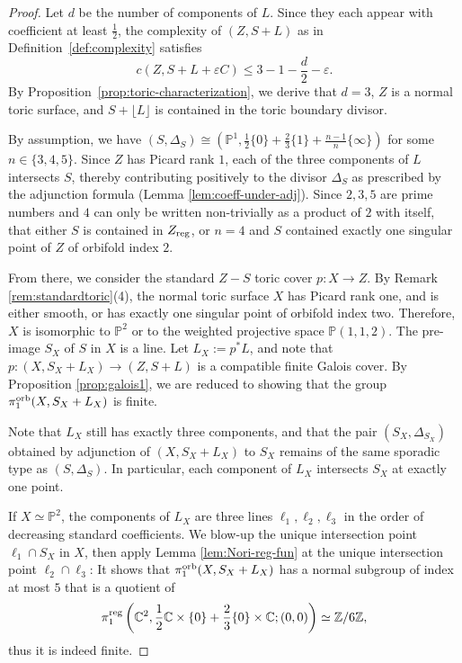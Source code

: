 \documentclass{amsart}
\newcommand{\pp}{\mathbb{P}}
\newcommand{\zz}{\mathbb{Z}}
\newcommand{\cc}{\mathbb{C}}
\theoremstyle{definition}
\theoremstyle{remark}
\numberwithin{equation}{section}
\begin{document}
\begin{proof}
Let $d$ be the number of components of $L$. Since they each appear with coefficient at least $\frac{1}{2}$, the complexity of $(Z,S+L)$ as in Definition~\ref{def:complexity} satisfies 
$$c(Z,S+L+\varepsilon C)\le 3-1-\frac{d}{2}-\varepsilon.$$ 
By Proposition~\ref{prop:toric-characterization}, we derive that $d=3$, $Z$ is a normal toric surface, and $S+\lfloor L\rfloor$ is contained in the toric boundary divisor.


By assumption, we have $(S,\Delta_S)\cong (\pp^1,\frac{1}{2}\{0\}+\frac{2}{3}\{1\}+\frac{n-1}{n}\{\infty\})$ for some $n\in\{3,4,5\}$.
Since $Z$ has Picard rank $1$, each of the three components of $L$ intersects $S$, thereby contributing positively to the divisor $\Delta_S$ as prescribed by the adjunction formula (Lemma \ref{lem:coeff-under-adj}). Since $2,3,5$ are prime numbers and $4$ can only be written non-trivially as a product of $2$ with itself, that either $S$ is contained in $Z_{\rm reg}$, or $n=4$ and $S$ contained exactly one singular point of $Z$ of orbifold index $2$.

From there, we consider the standard $Z - S$ toric cover $p:X\to Z$. By Remark \ref{rem:standardtoric}(4), the normal toric surface $X$ has Picard rank one, and is either smooth, or has exactly one singular point of orbifold index two. Therefore, $X$ is isomorphic to $\pp^2$ or to the weighted projective space $\pp(1,1,2)$. The pre-image $S_X$ of $S$ in $X$ is a line.
Let $L_X:=p^*L$, and note that $p:(X,S_X+L_X)\to (Z,S+L)$ is a compatible finite Galois cover. By Proposition \ref{prop:galois1}, we are reduced to showing that the group $\pi_1^{\rm orb}(X,S_X+L_X)$ is finite.

Note that $L_X$ still has exactly three components, and that the pair $(S_X,\Delta_{S_X})$ obtained by adjunction of $(X,S_X+L_X)$ to $S_X$ remains of the same sporadic type as $(S,\Delta_S)$. In particular, each component of $L_X$ intersects $S_X$ at exactly one point. 

If $X\simeq \pp^2$, the components of $L_X$ are three lines $\ell_1,\ell_2,\ell_3$ in the order of decreasing standard coefficients. We blow-up the unique intersection point $\ell_1\cap S_X$ in $X$, then apply Lemma \ref{lem:Nori-reg-fun} at the unique intersection point $\ell_2\cap \ell_3$: It shows that $\pi_1^{\rm orb}(X,S_X+L_X)$ has a normal subgroup of index at most $5$ that is a quotient of 
$$\pi_1^{\rm reg}\left(\cc^2,\frac{1}{2}\cc\times \{0\} + \frac{2}{3}\{0\}\times \cc;(0,0)\right)\simeq \zz/6\zz,$$
thus it is indeed finite.


\end{proof}
\end{document}
